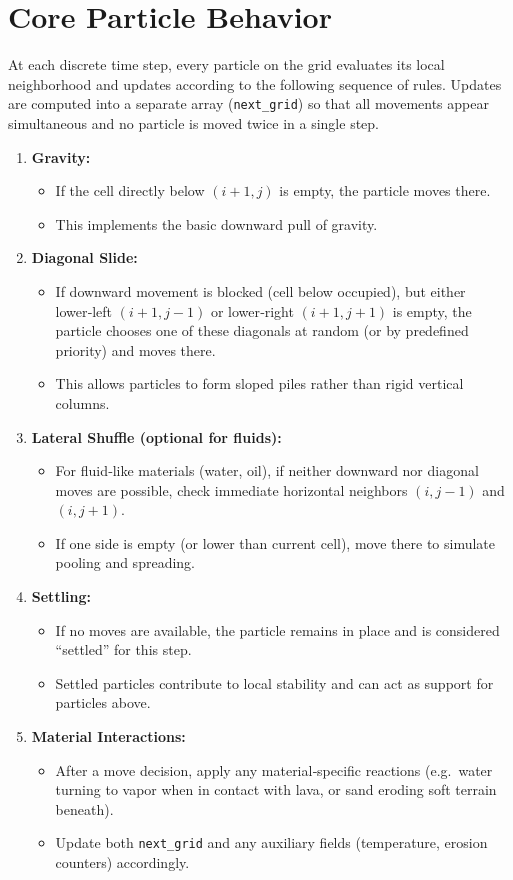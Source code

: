 \documentclass{article}
\begin{document}
\section{Core Particle Behavior}

At each discrete time step, every particle on the grid evaluates its local neighborhood and updates according to the following sequence of rules.  Updates are computed into a separate array (\texttt{next\_grid}) so that all movements appear simultaneous and no particle is moved twice in a single step.

\begin{enumerate}
  \item \textbf{Gravity:}  
    \begin{itemize}
      \item If the cell directly below \((i+1, j)\) is empty, the particle moves there.
      \item This implements the basic downward pull of gravity.
    \end{itemize}
  \item \textbf{Diagonal Slide:}  
    \begin{itemize}
      \item If downward movement is blocked (cell below occupied), but either lower‑left \((i+1, j-1)\) or lower‑right \((i+1, j+1)\) is empty, the particle chooses one of these diagonals at random (or by predefined priority) and moves there.
      \item This allows particles to form sloped piles rather than rigid vertical columns.
    \end{itemize}
  \item \textbf{Lateral Shuffle (optional for fluids):}  
    \begin{itemize}
      \item For fluid‑like materials (water, oil), if neither downward nor diagonal moves are possible, check immediate horizontal neighbors \((i, j-1)\) and \((i, j+1)\).  
      \item If one side is empty (or lower than current cell), move there to simulate pooling and spreading.
    \end{itemize}
  \item \textbf{Settling:}  
    \begin{itemize}
      \item If no moves are available, the particle remains in place and is considered “settled” for this step.
      \item Settled particles contribute to local stability and can act as support for particles above.
    \end{itemize}
  \item \textbf{Material Interactions:}  
    \begin{itemize}
      \item After a move decision, apply any material‑specific reactions (e.g.\ water turning to vapor when in contact with lava, or sand eroding soft terrain beneath).
      \item Update both \texttt{next\_grid} and any auxiliary fields (temperature, erosion counters) accordingly.
    \end{itemize}
\end{enumerate}
\end{document}
